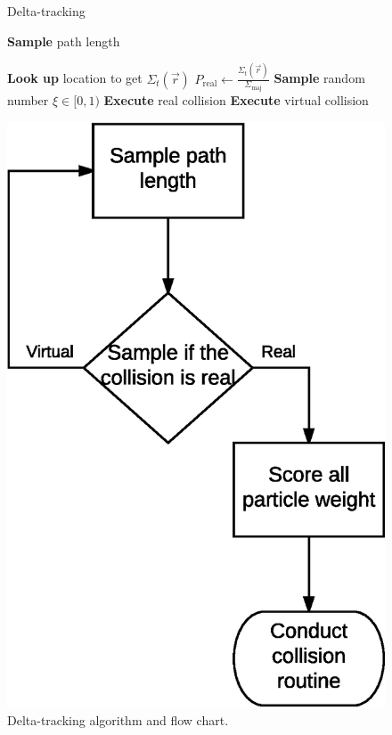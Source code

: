 \begin{figure}[p]
  \centering
  \begin{algorithm}[H]
\caption{Delta-tracking}\label{alg:dt}
\begin{algorithmic}[1]
  \State \textbf{Sample} path length

  \State \textbf{Look up} location to get $\Sigma_t(\vec{r})$
  \State $P_\mathrm{real} \gets
  \frac{\Sigma_t(\vec{r})}{\Sigma_\mathrm{maj}}$
  \State \textbf{Sample} random number $\xi \in [0,1)$
   
  \State \textbf{Execute} real collision
    \Else {}
    \State \textbf{Execute} virtual collision
  \EndIf
\end{algorithmic}
\end{algorithm}
\includegraphics[scale=0.5]{images/dt}
  \caption{Delta-tracking algorithm and flow chart.}
  \label{fig:dt}
\end{figure}

